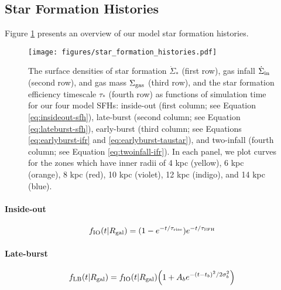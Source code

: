 \documentclass[twocolumn,linenumbers,twocolappendix]{aastex631}
\begin{document}
\subsection{Star Formation Histories}
\label{sec:sfh}

Figure \ref{fig:sfhs} presents an overview of our model star formation histories.

\begin{figure*}
    \centering
    \texttt{[image: figures/star\_formation\_histories.pdf]}
    \caption{The surface densities of star formation $\dot \Sigma_*$ (first row), gas infall $\dot \Sigma_{\rm in}$ (second row), and gas mass $\Sigma_{\rm gas}$ (third row), and the star formation efficiency timescale $\tau_*$ (fourth row) as functions of simulation time for our four model SFHs: inside-out (first column; see Equation \ref{eq:insideout-sfh}), late-burst (second column; see Equation \ref{eq:lateburst-sfh}), early-burst (third column; see Equations \ref{eq:earlyburst-ifr} and \ref{eq:earlyburst-taustar}), and two-infall (fourth column; see Equation \ref{eq:twoinfall-ifr}). In each panel, we plot curves for the zones which have inner radii of 4 kpc (yellow), 6 kpc (orange), 8 kpc (red), 10 kpc (violet), 12 kpc (indigo), and 14 kpc (blue).}
    \label{fig:sfhs}
\end{figure*}

\paragraph{Inside-out}
\begin{equation}
    f_{\rm IO}(t|R_{\rm gal}) = (1 - e^{-t/\tau_{\rm rise}}) e^{-t/\tau_{\rm SFH}}
    \label{eq:insideout-sfh}
\end{equation}

\paragraph{Late-burst}
\begin{equation}
    f_{\rm LB}(t|R_{\rm gal}) = f_{\rm IO}(t|R_{\rm gal}) \Big(1 + A_b e^{-(t-t_b)^2/2\sigma_b^2} \Big)
    \label{eq:lateburst-sfh}
\end{equation}
\end{document}
